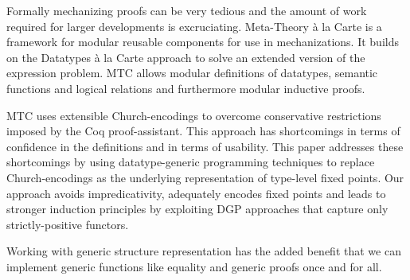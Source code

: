 
Formally mechanizing proofs can be very tedious and the amount of work
required for larger developments is excruciating. Meta-Theory \`a la Carte
is a framework for modular reusable components for use in
mechanizations. It builds on the Datatypes \`a la Carte approach to solve
an extended version of the expression problem. MTC allows modular
definitions of datatypes, semantic functions and logical relations and
furthermore modular inductive proofs.

MTC uses extensible Church-encodings to overcome conservative restrictions
imposed by the Coq proof-assistant. This approach has shortcomings
in terms of confidence in the definitions and in terms of usability. This
paper addresses these shortcomings by using datatype-generic
programming techniques to replace Church-encodings as the underlying representation
of type-level fixed points. Our approach avoids impredicativity, adequately
encodes fixed points and leads to stronger induction principles by
exploiting DGP approaches that capture only strictly-positive functors.

Working with generic structure representation has the added benefit that
we can implement generic functions like equality and generic proofs once and for all.
